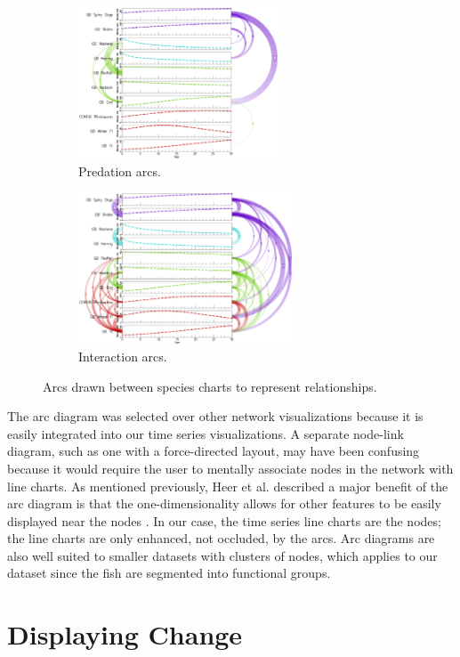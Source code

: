 \begin{figure}
\centering
	\begin{subfigure}[b]{0.48\textwidth}
		\centering
		\includegraphics[height=4.5cm]{figures/eps/arcs_predation.eps}
		\caption{Predation arcs.}
		\label{fig:arcsPredation}
	\end{subfigure}	
	\begin{subfigure}[b]{0.48\textwidth}
		\centering
		\includegraphics[height=4.5cm]{figures/eps/arcs_interaction.eps}
		\caption{Interaction arcs.}
		\label{fig:arcsInteraction}
	\end{subfigure}
	\caption{Arcs drawn between species charts to represent relationships.}
	\label{fig:betweenSpeciesArcs}
\end{figure}

The arc diagram was selected over other network visualizations because it is easily integrated into our time series visualizations.  A separate node-link diagram, such as one with a force-directed layout, may have been confusing because it would require the user to mentally associate nodes in the network with line charts.  As mentioned previously, Heer et al. described a major benefit of the arc diagram is that the one-dimensionality allows for other features to be easily displayed near the nodes \cite{heer2010}.  In our case, the time series line charts are the nodes; the line charts are only enhanced, not occluded, by the arcs.  Arc diagrams are also well suited to smaller datasets with clusters of nodes, which applies to our dataset since the fish are segmented into functional groups.

\section{Displaying Change}
\label{sec:displayingChange}

